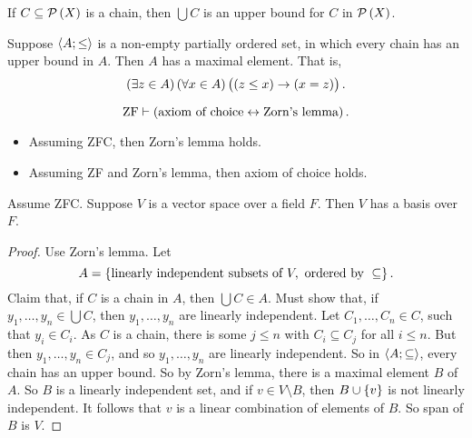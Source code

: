 \begin{example*}
If $ C \subseteq \PP\br{X} $ is a chain, then $ \bigcup C $ is an upper bound for $ C $ in $ \PP\br{X} $.
\end{example*}

\begin{definition}
Suppose $ \left\langle A; \le \right\rangle $ is a non-empty partially ordered set, in which every chain has an upper bound in $ A $. Then $ A $ has a maximal element. That is,
$$ \teb{z \in A}\fab{x \in A}\impb{\leb{z}{x}}{\eqb{x}{z}}. $$
\end{definition}

\begin{theorem}
\label{thm:4.3.2}
$$ \text{ZF} \vdash \iffb{\text{axiom of choice}}{\text{Zorn's lemma}}. $$
\begin{itemize}
\item Assuming ZFC, then Zorn's lemma holds.
\item Assuming ZF and Zorn's lemma, then axiom of choice holds.
\end{itemize}
\end{theorem}

\begin{example}
Assume ZFC. Suppose $ V $ is a vector space over a field $ F $. Then $ V $ has a basis over $ F $.
\end{example}

\begin{proof}
Use Zorn's lemma. Let
$$ A = \cbr{\text{linearly independent subsets of} \ V, \ \text{ordered by} \ \subseteq}. $$
Claim that, if $ C $ is a chain in $ A $, then $ \bigcup C \in A $. Must show that, if $ y_1, \dots, y_n \in \bigcup C $, then $ y_1, \dots, y_n $ are linearly independent. Let $ C_1, \dots, C_n \in C $, such that $ y_i \in C_i $. As $ C $ is a chain, there is some $ j \le n $ with $ C_i \subseteq C_j $ for all $ i \le n $. But then $ y_1, \dots, y_n \in C_j $, and so $ y_1, \dots, y_n $ are linearly independent. So in $ \left\langle A; \subseteq \right\rangle $, every chain has an upper bound. So by Zorn's lemma, there is a maximal element $ B $ of $ A $. So $ B $ is a linearly independent set, and if $ v \in V \setminus B $, then $ B \cup \cbr{v} $ is not linearly independent. It follows that $ v $ is a linear combination of elements of $ B $. So span of $ B $ is $ V $.
\end{proof}

